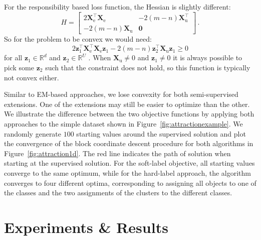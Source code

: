\documentclass[conference,a4paper,10pt]{IEEEtran}\usepackage[]{graphicx}\usepackage[]{color}
\begin{document}
For the responsibility based loss function, the Hessian is slightly different:
$$
H=\begin{bmatrix} 
2 \mathbf{X}_\text{e}^\top \mathbf{X}_\text{e} & 
-2 (m-n)\mathbf{X}_\text{u}^\top \\
-2 (m-n) \mathbf{X}_\text{u} &
\mathbf{0}
\end{bmatrix} \,.
$$
So for the problem to be convex we would need:
$$
2 \mathbf{z}^\top_1 \mathbf{X}_\text{e}^\top \mathbf{X}_\text{e} \mathbf{z}_1 - 2 (m-n)  \mathbf{z}_2^\top \mathbf{X}_\text{u} \mathbf{z}_1 \geq 0
$$  
for all $\mathbf{z}_1 \in \mathbb{R}^{d}$ and $\mathbf{z}_2 \in \mathbb{R}^{U}$ . When $\mathbf{X}_\text{u}\neq 0$ and $\mathbf{z}_1\neq 0$  it is always possible to pick some $\mathbf{z}_2$ such that the constraint does not hold, so this function is typically not convex either.

Similar to EM-based approaches, we lose convexity for both semi-supervised extensions. One of the extensions may still be easier to optimize than the other. We illustrate the difference between the two objective functions by applying both approaches to the simple dataset shown in Figure~\ref{fig:attractionexample}. We randomly generate $100$ starting values around the supervised solution and plot the convergence of the block coordinate descent procedure for both algorithms in Figure~\ref{fig:attraction1d}. The red line indicates the path of solution when starting at the supervised solution. For the soft-label objective, all starting values converge to the same optimum, while for the hard-label approach, the algorithm converges to four different optima, corresponding to assigning all objects to one of the classes and the two assignments of the clusters to the different classes.

\section{Experiments \& Results}
\end{document}
